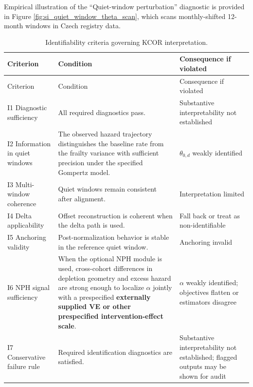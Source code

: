 \documentclass[
]{article}
\begin{document}
Empirical illustration of the ``Quiet-window perturbation'' diagnostic is provided in Figure \ref{fig:si_quiet_window_theta_scan}, which scans monthly-shifted 12-month windows in Czech registry data.

\begin{longtable}[]{@{}
  >{\raggedright\arraybackslash}p{}
  >{\raggedright\arraybackslash}p{}
  >{\raggedright\arraybackslash}p{}@{}}
\caption{Identifiability criteria governing KCOR interpretation.}\label{tbl:si_identifiability}\tabularnewline
\toprule\noalign{}
\begin{minipage}[b]{\linewidth}\raggedright
Criterion
\end{minipage} & \begin{minipage}[b]{\linewidth}\raggedright
Condition
\end{minipage} & \begin{minipage}[b]{\linewidth}\raggedright
Consequence if violated
\end{minipage} \\
\midrule\noalign{}
\endfirsthead
\toprule\noalign{}
\begin{minipage}[b]{\linewidth}\raggedright
Criterion
\end{minipage} & \begin{minipage}[b]{\linewidth}\raggedright
Condition
\end{minipage} & \begin{minipage}[b]{\linewidth}\raggedright
Consequence if violated
\end{minipage} \\
\midrule\noalign{}
\endhead
\bottomrule\noalign{}
\endlastfoot
I1 Diagnostic sufficiency & All required diagnostics pass. & Substantive interpretability not established \\
I2 Information in quiet windows & The observed hazard trajectory distinguishes the baseline rate from the frailty variance with sufficient precision under the specified Gompertz model. & \(\theta_{0,d}\) weakly identified \\
I3 Multi-window coherence & Quiet windows remain consistent after alignment. & Interpretation limited \\
I4 Delta applicability & Offset reconstruction is coherent when the delta path is used. & Fall back or treat as non-identifiable \\
I5 Anchoring validity & Post-normalization behavior is stable in the reference quiet window. & Anchoring invalid \\
I6 NPH signal sufficiency & When the optional NPH module is used, cross-cohort differences in depletion geometry and excess hazard are strong enough to localize \(\alpha\) jointly with a prespecified \textbf{externally supplied VE or other prespecified intervention-effect scale}. & \(\alpha\) weakly identified; objectives flatten or estimators disagree \\
I7 Conservative failure rule & Required identification diagnostics are satisfied. & Substantive interpretability not established; flagged outputs may be shown for audit \\
\end{longtable}
\end{document}
